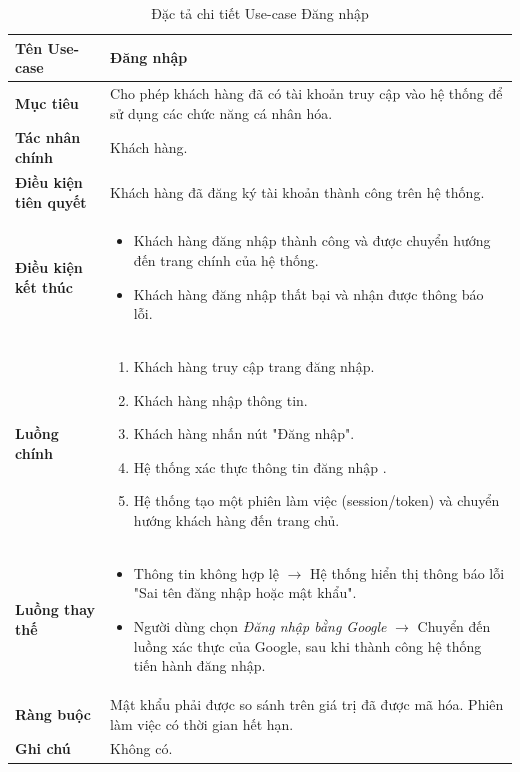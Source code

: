 \begin{table}[H]
\centering
\renewcommand{\arraystretch}{1.3}
\begin{tabular}{|p{4cm}|p{10cm}|}
\hline
\textbf{Tên Use-case} 
& Đăng nhập \\ 
\hline

\textbf{Mục tiêu} 
& Cho phép khách hàng đã có tài khoản truy cập vào hệ thống để sử dụng các chức năng cá nhân hóa. \\ 
\hline

\textbf{Tác nhân chính} 
& Khách hàng. \\ 
\hline

\textbf{Điều kiện tiên quyết} 
& Khách hàng đã đăng ký tài khoản thành công trên hệ thống. \\ 
\hline

\textbf{Điều kiện kết thúc} 
& 
\begin{itemize}
\item Khách hàng đăng nhập thành công và được chuyển hướng đến trang chính của hệ thống.
\item Khách hàng đăng nhập thất bại và nhận được thông báo lỗi.
\end{itemize} \\ 
\hline

\textbf{Luồng chính} 
& 
\begin{enumerate}
    \item Khách hàng truy cập trang đăng nhập.
    \item Khách hàng nhập thông tin.
    \item Khách hàng nhấn nút "Đăng nhập".
    \item Hệ thống xác thực thông tin đăng nhập .
    \item Hệ thống tạo một phiên làm việc (session/token) và chuyển hướng khách hàng đến trang chủ.
\end{enumerate} \\ 
\hline

\textbf{Luồng thay thế} 
& 
\begin{itemize}
    \item Thông tin không hợp lệ $\rightarrow$ Hệ thống hiển thị thông báo lỗi "Sai tên đăng nhập hoặc mật khẩu".
    \item Người dùng chọn \textit{Đăng nhập bằng Google} $\rightarrow$ Chuyển đến luồng xác thực của Google, sau khi thành công hệ thống tiến hành đăng nhập.
\end{itemize} \\ 
\hline

\textbf{Ràng buộc} 
& Mật khẩu phải được so sánh trên giá trị đã được mã hóa. Phiên làm việc có thời gian hết hạn. \\ 
\hline

\textbf{Ghi chú} 
& Không có. \\ 
\hline
\end{tabular}
\caption{Đặc tả chi tiết Use-case Đăng nhập}
\label{tab:login-spec}
\end{table}

